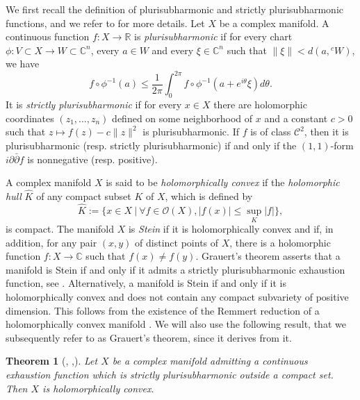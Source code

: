 \documentclass{article}
\newtheorem*{theorem*}{Theorem}
\theoremstyle{definition}
\theoremstyle{remark}
\newcommand{\C}{\mathbb{C}}
\newcommand{\R}{\mathbb{R}}
\begin{document}
	We first recall the definition of plurisubharmonic and strictly plurisubharmonic functions, and we refer to \cite[Chapter 1]{demaillyComplexAnalyticDifferential-manuel} for more details. Let $X$ be a complex manifold. A continuous function $f:X\to \R$ is \textit{plurisubharmonic} if for every chart $\phi:V\subset X\longrightarrow W\subset \C^{n}$, every $a\in W$ and every $\xi\in \C^{n}$ such that $\lVert \xi\rVert < d(a,{}^{c}W)$, we have \begin{equation*}
		f\circ\phi^{-1}(a) \le \frac{1}{2\pi}\int_{0}^{2\pi}f\circ\phi^{-1}(a+e^{i\theta}\xi)d\theta.
	\end{equation*}
	It is \textit{strictly plurisubharmonic} if for every $x\in X$ there are holomorphic coordinates $(z_1,\dots,z_n)$ defined on some neighborhood of $x$ and a constant $c>0$ such that $z\mapsto f(z)-c\lVert z\rVert^{2}$ is plurisubharmonic. If $f$ is of class $\mathcal{C}^2$, then it is plurisubharmonic (resp. strictly plurisubharmonic) if and only if the $(1,1)$-form $i\partial\bar\partial f$ is nonnegative (resp. positive).
	
	A complex manifold $X$ is said to be \textit{holomorphically convex} if the \textit{holomorphic hull} $\widehat{K}$ of any compact subset $K$ of $X$, which is defined by\begin{equation*}
		\widehat{K} := \{x\in X \ \vert\ \forall f\in \mathcal{O}(X), \lvert f(x)\rvert \le \sup_{K}\lvert f\rvert\},
	\end{equation*}
	is compact. The manifold $X$ is \textit{Stein} if it is holomorphically convex and if, in addition, for any pair $(x,y)$ of distinct points of $X$, there is a holomorphic function $f:X\longrightarrow \C$ such that $f(x)\ne f(y)$. Grauert's theorem asserts that a manifold is Stein if and only if it admits a strictly plurisubharmonic exhaustion function, see \cite{grauertLeviProblemImbedding1958}. Alternatively, a manifold is Stein if and only if it is holomorphically convex and does not contain any compact subvariety of positive dimension. This follows from the existence of the Remmert reduction of a holomorphically convex manifold \cite[Theorem 2.1]{peternellPseudoconvexityLeviProblem1994}. We will also use the following result, that we subsequently refer to as Grauert's theorem, since it derives from it.
	
	\begin{theorem*}[{\cite{grauertLeviProblemImbedding1958}, \cite[Corollary 2.4]{peternellPseudoconvexityLeviProblem1994}},\cite{narasimhanLeviProblemComplex1962}]
		Let $X$ be a complex manifold admitting a continuous exhaustion function which is strictly plurisubharmonic outside a compact set. Then $X$ is holomorphically convex.
	\end{theorem*} 
	
\end{document}
